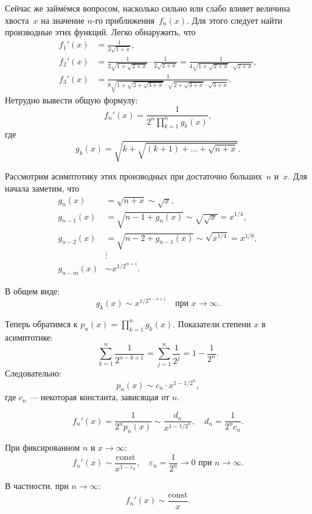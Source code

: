 \documentclass[12pt]{article}
\begin{document}
Сейчас же займёмся вопросом, насколько сильно или слабо влияет величина хвоста~\(x\) на значение \(n\)-го приближения~\(f_n(x)\). Для этого следует найти
производные этих функций. Легко обнаружить, что
\begin{align*}
f_1'(x) & = \frac{1}{2\sqrt{1 + x}}, \\
f_2'(x) & = \frac{1}{2\sqrt{1 + \sqrt{2 + x}}} \cdot \frac{1}{2\sqrt{2 + x}}
= \frac{1}{4\sqrt{1 + \sqrt{2 + x}} \cdot \sqrt{2 + x}} , \\
f_3'(x) & = \frac{1}{8\sqrt{1 + \sqrt{2 + \sqrt{3 + x}}} \cdot \sqrt{2 + \sqrt{3 + x}} \cdot \sqrt{3 + x}} .
\end{align*}
Нетрудно вывести общую формулу:
\begin{equation} \label{eq:derivative}
f_n'(x) = \frac{1}{2^n \prod_{k=1}^n g_k(x)},
\end{equation}
где
\begin{equation} \label{eq:derivative_aux}
g_k(x) = \sqrt{k + \sqrt{(k + 1) + \dots + \sqrt{n + x}}}.
\end{equation}

Рассмотрим асимптотику этих производных при достаточно больших~\(n\) и~\(x\). Для начала заметим, что
\begin{align*}
g_n(x) &= \sqrt{n + x} \sim \sqrt{x}, \\
g_{n-1}(x) &= \sqrt{n-1 + g_n(x)} \sim \sqrt{\sqrt{x}} = x^{1/4}, \\
g_{n-2}(x) &= \sqrt{n-2 + g_{n-1}(x)} \sim \sqrt{x^{1/4}} = x^{1/8}, \\
&\vdots \\
g_{n-m}(x) &\sim x^{1/2^{m+1}}.
\end{align*}

В общем виде:
\[
g_k(x) \sim x^{1/2^{n-k+1}} \quad \text{при } x \to \infty.
\]

Теперь обратимся к \(p_n(x) = \prod_{k=1}^n g_k(x)\). Показатели степени \(x\) в асимптотике:
\[
\sum_{k=1}^n \frac{1}{2^{n-k+1}} = \sum_{j=1}^n \frac{1}{2^j} = 1 - \frac{1}{2^n}.
\]
Следовательно:
\[
p_n(x) \sim c_n \cdot x^{1 - 1/2^n},
\]
где \( c_n \) — некоторая константа, зависящая от \( n \).

\[
f_n'(x) = \frac{1}{2^n p_n(x)} \sim \frac{d_n}{x^{1 - 1/2^n}}, \quad d_n = \frac{1}{2^n c_n}.
\]

При фиксированном \( n \) и \( x \to \infty \):
\[
f_n'(x) \sim \frac{\text{const}}{x^{1 - \varepsilon_n}}, \quad \varepsilon_n = \frac{1}{2^n} \to 0 \text{ при } n \to \infty.
\]

В частности, при \( n \to \infty \):
\[
f_n'(x) \sim \frac{\text{const}}{x}.
\]
\end{document}
